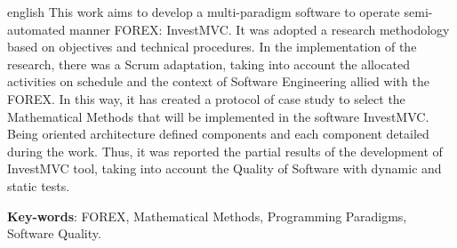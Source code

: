 \begin{resumo}[Abstract]
 \begin{otherlanguage*}{english}
This work aims to develop a multi-paradigm software to operate semi-automated manner
FOREX: InvestMVC. It was adopted a research methodology based on objectives and
technical procedures. In the implementation of the research, there was a Scrum adaptation, taking into account the allocated activities on schedule and the context of Software
Engineering allied with the FOREX. In this way, it has created a protocol of case study to select the Mathematical Methods that will be implemented in the software
InvestMVC. Being oriented architecture defined components and each component detailed
during the work. Thus, it was reported the partial results of the development of InvestMVC tool, taking into account the Quality of Software with dynamic and static tests.
   \vspace{\onelineskip}
 
   \noindent
   \textbf{Key-words}: FOREX, Mathematical Methods, Programming Paradigms, Software Quality.
 \end{otherlanguage*}
\end{resumo}
